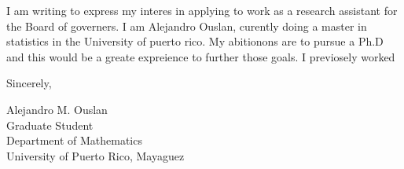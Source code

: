 \documentclass{article}
\begin{document}

I am writing to express my interes in applying to work as a research assistant for the Board of governers. I am Alejandro Ouslan, curently doing a master in statistics in the University of puerto rico. 
My abitionons are to pursue a Ph.D and this would be a greate expreience to further those goals. I previosely worked 

\bigskip %

Sincerely,

\vspace{20pt} %



Alejandro M. Ouslan \\
Graduate Student \\
Department of Mathematics \\
University of Puerto Rico, Mayaguez
\end{document}
